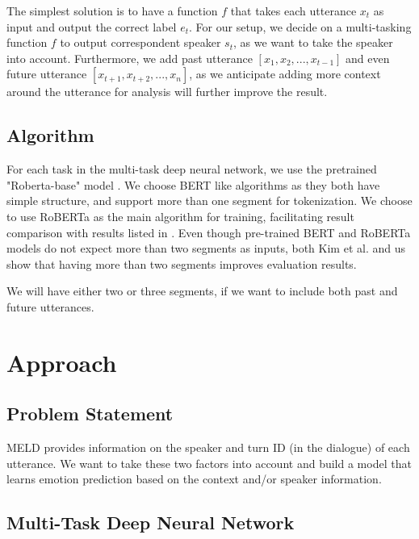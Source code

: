 \documentclass[11pt]{article}
\begin{document}
The simplest solution is to have a function $f$ that takes each utterance $x_t$ as input and output the correct label $e_t$. For our setup, we decide on a multi-tasking function $f$ to output correspondent speaker $s_t$, as we want to take the speaker into account. Furthermore, we add past utterance $[x_1, x_2, ..., x_{t-1}]$ and even future utterance $[x_{t+1}, x_{t+2}, ..., x_n]$, as we anticipate adding more context around the utterance for analysis will further improve the result.


\subsection{Algorithm}

For each task in the multi-task deep neural network, we use the pretrained "Roberta-base" model \citet{liu-etal-2019-multi}. We choose BERT like algorithms as they both have simple structure, and support more than one segment for tokenization. We choose to use RoBERTa as the main algorithm for training, facilitating result comparison with results listed in \citet{kim-2021-emoberta}. Even though pre-trained BERT and RoBERTa models do not expect more than two segments as inputs, both Kim et al. and us show that having more than two segments improves evaluation results.

We will have either two or three segments, if we want to include both past and future utterances.


\section{Approach}
\label{sec:approach}

\subsection{Problem Statement}
MELD provides information on the speaker and turn ID (in the dialogue) of each utterance. We want to take these two factors into account and build a model that learns emotion prediction based on the context and/or speaker information.


\subsection{Multi-Task Deep Neural Network}
\end{document}
